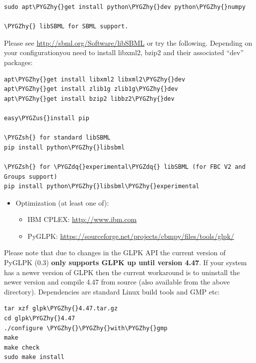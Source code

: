 \documentclass[a4paper,11pt,english]{sphinxmanual}
\def\PYGZus{\char`\_}
\def\PYGZsh{\char`\#}
\def\PYGZhy{\char`\-}
\def\PYGZdq{\char`\"}
\begin{document}
\begin{Verbatim}[commandchars=\\\{\}]
sudo apt\PYGZhy{}get install python\PYGZhy{}dev python\PYGZhy{}numpy

\PYGZhy{} libSBML for SBML support.
\end{Verbatim}

Please see \href{http://sbml.org/Software/libSBML}{http://sbml.org/Software/libSBML} or try the following. Depending on your configurationyou need to install libxml2, bzip2 and their associated ``dev'' packages:

\begin{Verbatim}[commandchars=\\\{\}]
apt\PYGZhy{}get install libxml2 libxml2\PYGZhy{}dev
apt\PYGZhy{}get install zlib1g zlib1g\PYGZhy{}dev
apt\PYGZhy{}get install bzip2 libbz2\PYGZhy{}dev

easy\PYGZus{}install pip

\PYGZsh{} for standard libSBML
pip install python\PYGZhy{}libsbml

\PYGZsh{} for \PYGZdq{}experimental\PYGZdq{} libSBML (for FBC V2 and Groups support)
pip install python\PYGZhy{}libsbml\PYGZhy{}experimental
\end{Verbatim}
\begin{itemize}
\item {} 
Optimization (at least one of):
\begin{itemize}
\item {} 
IBM CPLEX: \href{http://www.ibm.com}{http://www.ibm.com}

\item {} 
PyGLPK: \href{https://sourceforge.net/projects/cbmpy/files/tools/glpk/}{https://sourceforge.net/projects/cbmpy/files/tools/glpk/}

\end{itemize}

\end{itemize}

Please note that due to changes in the GLPK API the current version of PyGLPK (0.3) \textbf{only supports GLPK up
until version 4.47}. If your system has a newer version of GLPK then the current workaround is to uninstall the newer
version and compile 4.47 from source (also available from the above directory). Dependencies are standard Linux build tools
and GMP etc:

\begin{Verbatim}[commandchars=\\\{\}]
tar xzf glpk\PYGZhy{}4.47.tar.gz
cd glpk\PYGZhy{}4.47
./configure \PYGZhy{}\PYGZhy{}with\PYGZhy{}gmp
make
make check
sudo make install
\end{Verbatim}
\end{document}
